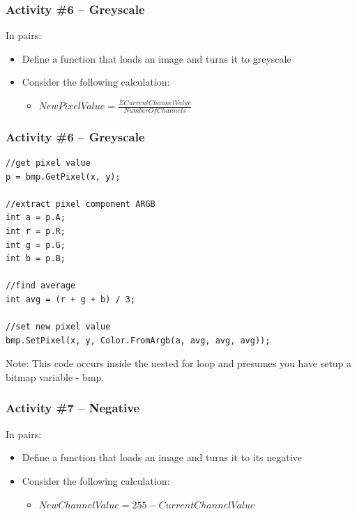\begin{frame}
	\frametitle{Activity \#6 -- Greyscale}
	
	In pairs:
	
	\vspace{2em}
	
	\begin{itemize}
		\item Define a function that loads an image and turns it to greyscale
		\item Consider the following calculation:
		\begin{itemize}
			\item $New Pixel Value = \frac{\Sigma Current Channel Value}{Number Of Channels}$
		\end{itemize}
	\end{itemize}
\end{frame}

\begin{frame}[fragile]
	\frametitle{Activity \#6 -- Greyscale}
	
\begin{lstlisting}
//get pixel value
p = bmp.GetPixel(x, y);

//extract pixel component ARGB
int a = p.A;
int r = p.R;
int g = p.G;
int b = p.B;

//find average
int avg = (r + g + b) / 3;

//set new pixel value
bmp.SetPixel(x, y, Color.FromArgb(a, avg, avg, avg));
\end{lstlisting}

Note: This code occurs inside the nested for loop and presumes you have setup a bitmap variable - bmp.

\end{frame}

\begin{frame}
	\frametitle{Activity \#7 -- Negative}
	
	In pairs:
	
	\vspace{2em}
	
	\begin{itemize}
		\item Define a function that loads an image and turns it to its negative
		\item Consider the following calculation:
		\begin{itemize}
			\item $New Channel Value = 255 - Current Channel Value$
		\end{itemize}
	\end{itemize}
\end{frame}

